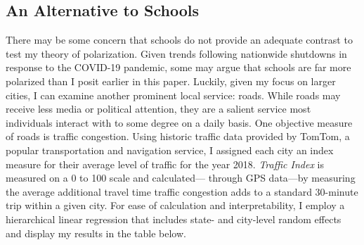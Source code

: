 \subsection{An Alternative to Schools}
There may be some concern that schools do not provide an adequate contrast to test my theory of polarization. Given trends following nationwide shutdowns in response to the COVID-19 pandemic, some may argue that schools are far more polarized than I posit earlier in this paper. Luckily, given my focus on larger cities, I can examine another prominent local service: roads. While roads may receive less media or political attention, they are a salient service most individuals interact with to some degree on a daily basis. One objective measure of roads is traffic congestion. Using historic traffic data provided by TomTom, a popular transportation and navigation service, I assigned each city an index measure for their average level of traffic for the year 2018. \textit{Traffic Index} is measured on a 0 to 100 scale and calculated--- through GPS data---by measuring the average additional travel time traffic congestion adds to a standard 30-minute trip within a given city. For ease of calculation and interpretability, I employ a hierarchical linear regression that includes state- and city-level random effects and display my results in the table below.

